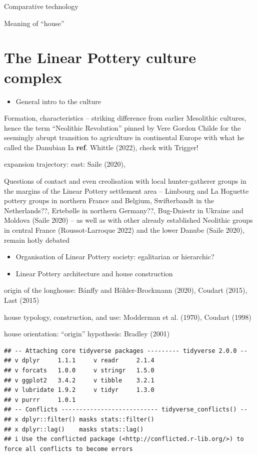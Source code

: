\documentclass[
  12pt,
]{book}
\providecommand{\tightlist}{%
  \setlength{\itemsep}{0pt}\setlength{\parskip}{0pt}}
\begin{document}
Comparative technology

Meaning of ``house''

\hypertarget{lbk}{%
\section{The Linear Pottery culture complex}\label{lbk}}

\begin{itemize}
\tightlist
\item
  General intro to the culture
\end{itemize}

Formation, characteristics -- striking difference from earlier Mesolithic cultures, hence the term ``Neolithic Revolution'' pinned by Vere Gordon Childe for the seemingly abrupt transition to agriculture in continental Europe with what he called the Danubian Ia \textbf{ref}. Whittle (2022), check with Trigger!

expansion trajectory: east: Saile (2020),

Questions of contact and even creolisation with local hunter-gatherer groups in the margins of the Linear Pottery settlement area -- Limbourg and La Hoguette pottery groups in northern France and Belgium, Swifterbandt in the Netherlands??, Ertebølle in northern Germany??, Bug-Dniestr in Ukraine and Moldova (Saile 2020) -- as well as with other already established Neolithic groups in central France (Roussot‑Larroque 2022) and the lower Danube (Saile 2020), remain hotly debated

\begin{itemize}
\tightlist
\item
  Organisation of Linear Pottery society: egalitarian or hierarchic?
\item
  Linear Pottery architecture and house construction
\end{itemize}

origin of the longhouse: Bánffy and Höhler-Brockmann (2020), Coudart (2015), Last (2015)

house typology, construction, and use: Modderman et al. (1970), Coudart (1998)

house orientation: ``origin'' hypothesis: Bradley (2001)

\begin{verbatim}
## -- Attaching core tidyverse packages --------- tidyverse 2.0.0 --
## v dplyr     1.1.1     v readr     2.1.4
## v forcats   1.0.0     v stringr   1.5.0
## v ggplot2   3.4.2     v tibble    3.2.1
## v lubridate 1.9.2     v tidyr     1.3.0
## v purrr     1.0.1     
## -- Conflicts --------------------------- tidyverse_conflicts() --
## x dplyr::filter() masks stats::filter()
## x dplyr::lag()    masks stats::lag()
## i Use the conflicted package (<http://conflicted.r-lib.org/>) to force all conflicts to become errors
\end{verbatim}
\end{document}
